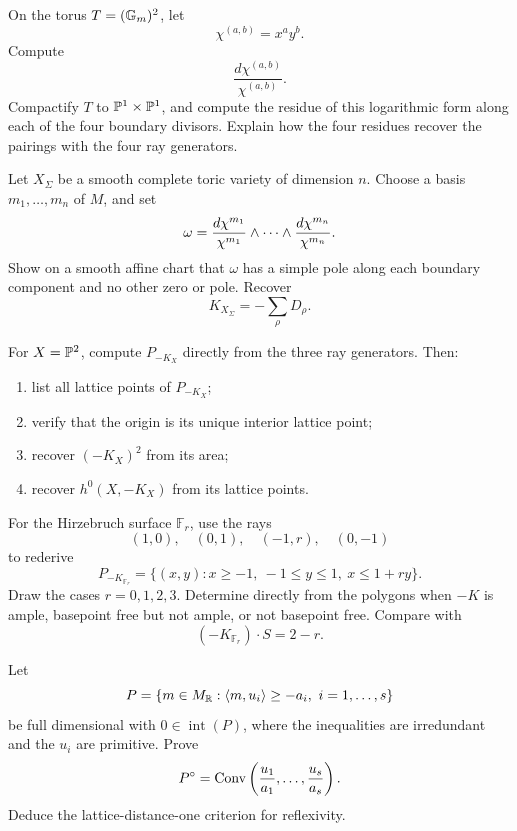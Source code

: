 \begin{exercises}

\item On the torus \(T=(\mathbb{G}_{m})^2\), let
\[
\chi^{(a,b)}=x^ay^b.
\]
Compute
\[
\frac{d\chi^{(a,b)}}{\chi^{(a,b)}}.
\]
Compactify \(T\) to \(\mathbb{P}^1\times\mathbb{P}^1\), and compute the residue of
this logarithmic form along each of the four boundary divisors.
Explain how the four residues recover the pairings with the four ray
generators.

\item Let \(X_\Sigma\) be a smooth complete toric variety of dimension
\(n\). Choose a basis \(m_1,\dots,m_n\) of \(M\), and set
\[
\omega
=
\frac{d\chi^{m_1}}{\chi^{m_1}}
\wedge\cdots\wedge
\frac{d\chi^{m_n}}{\chi^{m_n}}.
\]
Show on a smooth affine chart that \(\omega\) has a simple pole along
each boundary component and no other zero or pole. Recover
\[
K_{X_\Sigma}=-\sum_\rho D_\rho.
\]

\item For \(X=\mathbb{P}^2\), compute \(P_{-K_X}\) directly from the three
ray generators. Then:
\begin{enumerate}[label=(\alph*),wide=0pt]
\item list all lattice points of \(P_{-K_X}\);
\item verify that the origin is its unique interior lattice point;
\item recover \((-K_X)^2\) from its area;
\item recover \(h^0(X,-K_X)\) from its lattice points.
\end{enumerate}

\item For the Hirzebruch surface \(\mathbb F_r\), use the rays
\[
(1,0),\quad(0,1),\quad(-1,r),\quad(0,-1)
\]
to rederive
\[
P_{-K_{\mathbb F_r}}
=
\{(x,y):x\geq-1,\ -1\leq y\leq1,\ x\leq1+ry\}.
\]
Draw the cases \(r=0,1,2,3\). Determine directly from the polygons
when \(-K\) is ample, basepoint free but not ample, or not basepoint
free. Compare with
\[
(-K_{\mathbb F_r})\cdot S=2-r.
\]

\item Let
\[
P=\{m\in M_{\mathbb{R}}:\langle m,u_i\rangle\geq-a_i,
\ i=1,\dots,s\}
\]
be full dimensional with \(0\in\operatorname{int}(P)\), where the
inequalities are irredundant and the \(u_i\) are primitive. Prove
\[
P^\circ
=
\operatorname{Conv}\left(\frac{u_1}{a_1},\dots,
\frac{u_s}{a_s}\right).
\]
Deduce the lattice-distance-one criterion for reflexivity.


\end{exercises}
